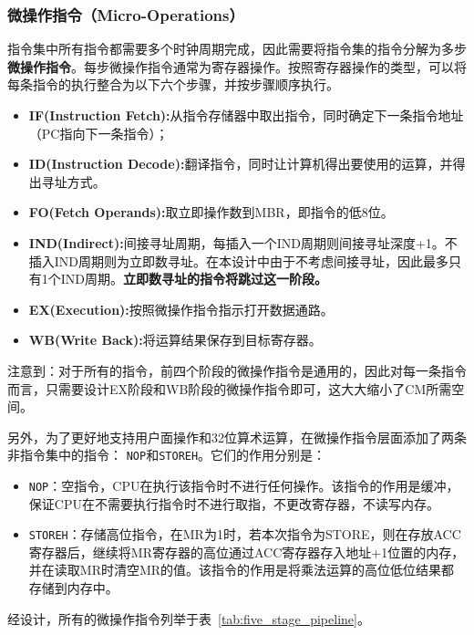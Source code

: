 \documentclass[lang=cn,a4paper,newtx]{elegantpaper}
\begin{document}
\subsubsection{微操作指令（Micro-Operations）}\label{sec:cu:micro}
指令集中所有指令都需要多个时钟周期完成，因此需要将指令集的指令分解为多步\textbf{微操作指令}。每步微操作指令通常为寄存器操作。按照寄存器操作的类型，可以将每条指令的执行整合为以下六个步骤，并按步骤顺序执行。
\begin{itemize}
  \item \textbf{IF(Instruction Fetch):}从指令存储器中取出指令，同时确定下一条指令地址（PC指向下一条指令）；
  \item \textbf{ID(Instruction Decode):}翻译指令，同时让计算机得出要使用的运算，并得出寻址方式。
  \item \textbf{FO(Fetch Operands):}取立即操作数到MBR，即指令的低8位。
  \item \textbf{IND(Indirect):}间接寻址周期，每插入一个IND周期则间接寻址深度+1。不插入IND周期则为立即数寻址。在本设计中由于不考虑间接寻址，因此最多只有1个IND周期。\textbf{立即数寻址的指令将跳过这一阶段。}
  \item \textbf{EX(Execution):}按照微操作指令指示打开数据通路。
  \item \textbf{WB(Write Back):}将运算结果保存到目标寄存器。
\end{itemize}

注意到：对于所有的指令，前四个阶段的微操作指令是通用的，因此对每一条指令而言，只需要设计EX阶段和WB阶段的微操作指令即可，这大大缩小了CM所需空间。

另外，为了更好地支持用户面操作和32位算术运算，在微操作指令层面添加了两条非指令集中的指令：
\texttt{NOP}和\texttt{STOREH}。它们的作用分别是：
\begin{itemize}
  \item \texttt{NOP}：空指令，CPU在执行该指令时不进行任何操作。该指令的作用是缓冲，保证CPU在不需要执行指令时不进行取指，不更改寄存器，不读写内存。
  \item \texttt{STOREH}：存储高位指令，在MR为1时，若本次指令为STORE，则在存放ACC寄存器后，继续将MR寄存器的高位通过ACC寄存器存入地址+1位置的内存，并在读取MR时清空MR的值。该指令的作用是将乘法运算的高位低位结果都存储到内存中。
\end{itemize}

经设计，所有的微操作指令列举于表~\ref{tab:five_stage_pipeline}。
\end{document}
